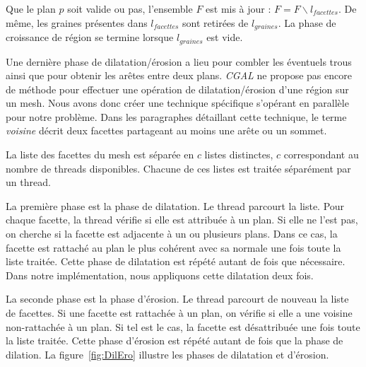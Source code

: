 ﻿\documentclass[12pt, twoside]{article}
\begin{document}
Que le plan $p$ soit valide ou pas, l'ensemble $F$ est mis à jour : $F = F\backslash l_{facettes}$. De même, les graines présentes dans $l_{facettes}$ sont retirées de $l_{graines}$. La phase de croissance de région se termine lorsque $l_{graines}$ est vide.

Une dernière phase de dilatation/érosion a lieu pour combler les éventuels trous ainsi que pour obtenir les arêtes entre deux plans. \textit{CGAL} ne propose pas encore de méthode pour effectuer une opération de dilatation/érosion d'une région sur un mesh. Nous avons donc créer une technique spécifique s'opérant en parallèle  pour notre problème. Dans les paragraphes détaillant cette technique, le terme \textit{voisine} décrit deux facettes partageant au moins une arête ou un sommet.

La liste des facettes du mesh est séparée en $c$ listes distinctes, $c$ correspondant au nombre de threads disponibles. Chacune de ces listes est traitée séparément par un thread.

La première phase est la phase de dilatation. Le thread parcourt la liste. Pour chaque facette, la thread vérifie si elle est attribuée à un plan. Si elle ne l'est pas, on cherche si la facette est adjacente à un ou plusieurs plans. Dans ce cas, la facette est rattaché au plan le plus cohérent avec sa normale une fois toute la liste traitée. Cette phase de dilatation est répété autant de fois que nécessaire. Dans notre implémentation, nous appliquons cette dilatation deux fois.

La seconde phase est la phase d'érosion. Le thread parcourt de nouveau la liste de facettes. Si une facette est rattachée à un plan, on vérifie si elle a une voisine non-rattachée à un plan. Si tel est le cas, la facette est désattribuée une fois toute la liste traitée. Cette phase d'érosion est répété autant de fois que la phase de dilation. La figure~\ref{fig:DilEro} illustre les phases de dilatation et d'érosion.
\end{document}
